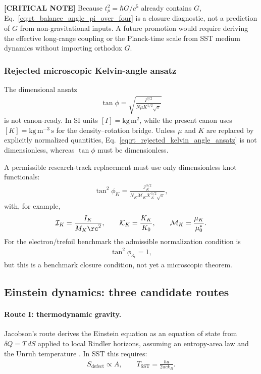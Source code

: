 \textbf{[CRITICAL NOTE]} Because \(t_p^2=\hbar G/c^5\) already contains \(G\),
Eq.~\eqref{eq:rt_balance_angle_pi_over_four} is a closure diagnostic, not a
prediction of \(G\) from non-gravitational inputs.  A future promotion would
require deriving the effective long-range coupling or the Planck-time scale
from SST medium dynamics without importing orthodox \(G\).

\subsubsection{Rejected microscopic Kelvin-angle ansatz}
The dimensional ansatz
\begin{align}
    \tan\phi
    =
    \sqrt{
    \frac{I^{3/2}}{N\mu K^{1/2}\sqrt{\pi}}
    }
    \label{eq:rt_rejected_kelvin_angle_ansatz}
\end{align}
is not canon-ready.  In SI units \([I]=\mathrm{kg\,m^2}\), while the present
canon uses \([K]=\mathrm{kg\,m^{-3}\,s}\) for the density--rotation bridge.
Unless \(\mu\) and \(K\) are replaced by explicitly normalized quantities,
Eq.~\eqref{eq:rt_rejected_kelvin_angle_ansatz} is not dimensionless, whereas
\(\tan\phi\) must be dimensionless.

A permissible research-track replacement must use only dimensionless knot
functionals:
\begin{align}
    \tan^2\phi_K
    =
    \frac{\mathcal{I}_K^{3/2}}
    {N_K\mathcal{M}_K\mathcal{K}_K^{1/2}\sqrt{\pi}},
    \label{eq:rt_dimensionless_kelvin_angle}
\end{align}
with, for example,
\begin{align}
    \mathcal{I}_K=\frac{I_K}{M_K\rc^2},
    \qquad
    \mathcal{K}_K=\frac{K_K}{K_0},
    \qquad
    \mathcal{M}_K=\frac{\mu_K}{\mu_0^\ast}.
\end{align}
For the electron/trefoil benchmark the admissible normalization condition is
\begin{align}
    \tan^2\phi_{3_1}=1,
\end{align}
but this is a benchmark closure condition, not yet a microscopic theorem.

\subsection{Einstein dynamics: three candidate routes}

\paragraph{Route I: thermodynamic gravity.}
Jacobson's route derives the Einstein equation as an equation of state from
\(\delta Q=T\,dS\) applied to local Rindler horizons, assuming an entropy-area
law and the Unruh temperature \cite{Jacobson1995}. In SST this requires:
\begin{align}
    S_{\mathrm{defect}}
    \propto
    A,
    \qquad
    T_{\mathrm{SST}}
    =
    \frac{\hbar a}{2\pi c k_B}.
\end{align}

